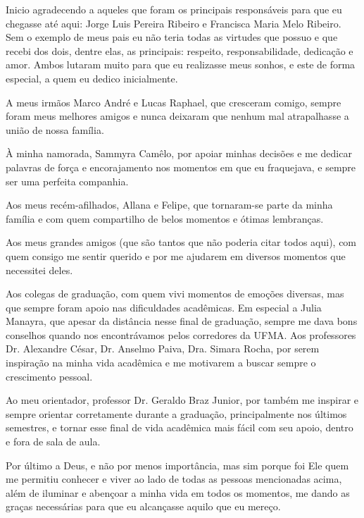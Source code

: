 \documentclass[
12pt,       %
openright,      %
oneside,      %
a4paper,      %
english,      %
french,       %
spanish,      %
brazil        %
]{abntex2}
\begin{document}
\begin{agradecimentos}

Inicio agradecendo a aqueles que foram os principais responsáveis para que eu chegasse até aqui: Jorge Luis Pereira Ribeiro e Francisca Maria Melo Ribeiro. Sem o exemplo de meus pais eu não teria todas as virtudes que possuo e que recebi dos dois, dentre elas, as principais: respeito, responsabilidade, dedicação e amor. Ambos lutaram muito para que eu realizasse meus sonhos, e este de forma especial, a quem eu dedico inicialmente.

A meus irmãos Marco André e Lucas Raphael, que cresceram comigo, sempre foram meus melhores amigos e nunca deixaram que nenhum mal atrapalhasse a união de nossa família.

À minha namorada, Sammyra Camêlo, por apoiar minhas decisões e me dedicar palavras de força e encorajamento nos momentos em que eu fraquejava, e sempre ser uma perfeita companhia.

Aos meus recém-afilhados, Allana e Felipe, que tornaram-se parte da minha família e com quem compartilho de belos momentos e ótimas lembranças.

Aos meus grandes amigos (que são tantos que não poderia citar todos aqui), com quem consigo me sentir querido e por me ajudarem em diversos momentos que necessitei deles.

Aos colegas de graduação, com quem vivi momentos de emoções diversas, mas que sempre foram apoio nas dificuldades acadêmicas. Em especial a Julia Manayra, que apesar da distância nesse final de graduação, sempre me dava bons conselhos quando nos encontrávamos pelos corredores da UFMA. Aos professores Dr. Alexandre César, Dr. Anselmo Paiva, Dra. Simara Rocha, por serem inspiração na minha vida acadêmica e me motivarem a buscar sempre o crescimento pessoal.

Ao meu orientador, professor Dr. Geraldo Braz Junior, por também me inspirar e sempre orientar corretamente durante a graduação, principalmente nos últimos semestres, e tornar esse final de vida acadêmica mais fácil com seu apoio, dentro e fora de sala de aula.

Por último a Deus, e não por menos importância, mas sim porque foi Ele quem me permitiu conhecer e viver ao lado de todas as pessoas mencionadas acima, além de iluminar e abençoar a minha vida em todos os momentos, me dando as graças necessárias para que eu alcançasse aquilo que eu mereço.

\end{agradecimentos}
\end{document}
